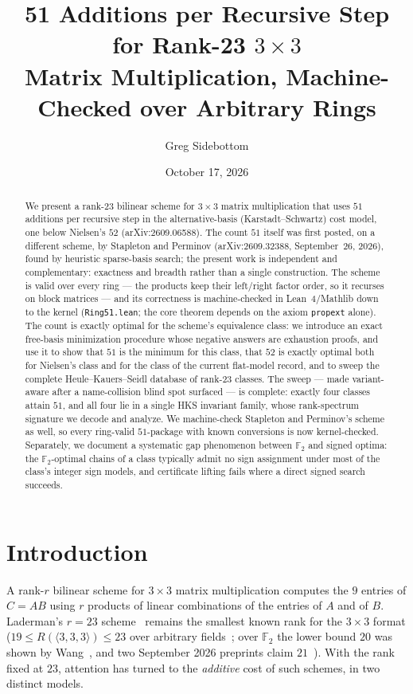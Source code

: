 \documentclass[11pt]{article}
\title{51 Additions per Recursive Step for Rank-23 $3\times3$\\
Matrix Multiplication, Machine-Checked over Arbitrary Rings}
\author{Greg Sidebottom}
\date{October 17, 2026}
\theoremstyle{definition}
\theoremstyle{remark}
\newcommand{\F}{\mathbb{F}}
\begin{document}
\maketitle

\begin{abstract}
We present a rank-23 bilinear scheme for $3\times3$ matrix
multiplication that uses $51$ additions per recursive step in the
alternative-basis (Karstadt--Schwartz) cost model, one below
Nielsen's $52$ (arXiv:2609.06588).  The count $51$ itself was first
posted, on a different scheme, by Stapleton and Perminov
(arXiv:2609.32388, September~26, 2026), found by heuristic sparse-basis
search; the present work is independent and complementary: exactness
and breadth rather than a single construction.  The scheme is
valid over every ring --- the products keep their left/right factor
order, so it recurses on block matrices --- and its correctness is
machine-checked in Lean~4/Mathlib down to the kernel
(\texttt{Ring51.lean}; the core theorem depends on the axiom
\texttt{propext} alone).  The count is exactly optimal for the
scheme's equivalence class: we introduce an exact free-basis
minimization procedure whose negative answers are exhaustion proofs,
and use it to show that $51$ is the minimum for this class, that $52$
is exactly optimal both for Nielsen's class and for the class of the
current flat-model record, and to sweep the complete Heule--Kauers--Seidl
database of rank-23 classes.  The sweep --- made variant-aware after a name-collision blind spot
surfaced --- is complete: exactly four
classes attain $51$, and all four lie in a single HKS invariant
family, whose rank-spectrum signature we decode and analyze.  We machine-check
Stapleton and Perminov's scheme as well, so every ring-valid
$51$-package with known conversions is now kernel-checked.
Separately, we document a systematic gap
phenomenon between $\F_2$ and signed optima: the $\F_2$-optimal chains
of a class typically admit no sign assignment under most of the
class's integer sign models, and certificate lifting fails where a
direct signed search succeeds.
\end{abstract}

\section{Introduction}\label{sec:intro}

A rank-$r$ bilinear scheme for $3\times3$ matrix multiplication
computes the $9$ entries of $C=AB$ using $r$ products of linear
combinations of the entries of $A$ and of $B$.  Laderman's $r=23$
scheme~\cite{Laderman76} remains the smallest known rank for the
$3\times3$ format ($19\le R(\langle3,3,3\rangle)\le23$ over
arbitrary fields~\cite{Blaser03}; over $\F_2$ the lower bound $20$ was
shown by Wang~\cite{Wang26}, and two September 2026 preprints claim
$21$~\cite{Wang26b,Qiushi26}).  With the rank fixed at $23$, attention
has turned to the \emph{additive} cost of such schemes, in two
distinct models.
\end{document}
